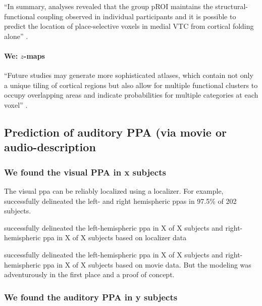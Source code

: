 ``In summary, analyses revealed that the group pROI maintains the
structural-functional coupling observed in individual participants and it is
possible to predict the location of place-selective voxels in medial VTC from
cortical folding alone'' \citep{weiner2018defining}.


\paragraph{We: $z$-maps}



``Future studies may generate more sophisticated atlases, which contain not only
a unique tiling of cortical regions but also allow for multiple functional
clusters to occupy overlapping areas and indicate probabilities for multiple
categories at each voxel'' \citep{rosenke2021probabilistic}.








\subsection{Prediction of auditory PPA (via movie or audio-description}

\subsubsection{We found the visual PPA in x subjects}

The visual \ac{ppa} can be reliably localized using a localizer.
%
For example, \citet{zhen2017quantifying} successfully delineated the left- and
right hemispheric \acp{ppa} in 97.5\% of 202 subjects.

\citet{sengupta2016extension} successfully delineated the left-hemispheric
\ac{ppa} in X of X subjects and right-hemispheric \ac{ppa} in X of X subjects
based on localizer data

\citet{haeusler2022processing} successfully delineated the left-hemispheric
\ac{ppa} in X of X subjects and right-hemispheric \ac{ppa} in X of X subjects
based on movie data.
%
But the modeling was adventurously in the first place and a proof of concept.


\subsubsection{We found the auditory PPA in y subjects}

